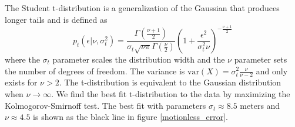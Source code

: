 \documentclass[10pt,journal]{IEEEtran}
\begin{document}
The Student t-distribution is a generalization of the Gaussian that produces longer tails and is defined as 
\begin{equation}
\label{student_pdf}
p_t\left(\epsilon |\nu,\sigma_t^2\right) = \frac{\Gamma\left( \frac{\nu + 1}{2} \right)}{\sigma_t \sqrt{\nu \pi} \Gamma\left(\frac{\nu}{2}\right)} \left( 1 + \frac{\epsilon^2}{\sigma_t^2 \nu} \right)^{-\frac{\nu+1}{2}}
\end{equation}
where the $\sigma_t$ parameter scales the distribution width and the $\nu$ parameter sets the number of degrees of freedom. The variance is $\textrm{var}(X)=\sigma_t^2 \frac{\nu}{\nu-2}$ and only exists for $\nu > 2$. The t-distribution is equivalent to the Gaussian distribution when $\nu \rightarrow \infty$. We find the best fit t-distribution to the data by maximizing the Kolmogorov-Smirnoff test. The best fit with parameters $\sigma_t \approx 8.5$ meters and $\nu \approx 4.5$ is shown as the black line in figure \ref{motionless_error}.
\end{document}
